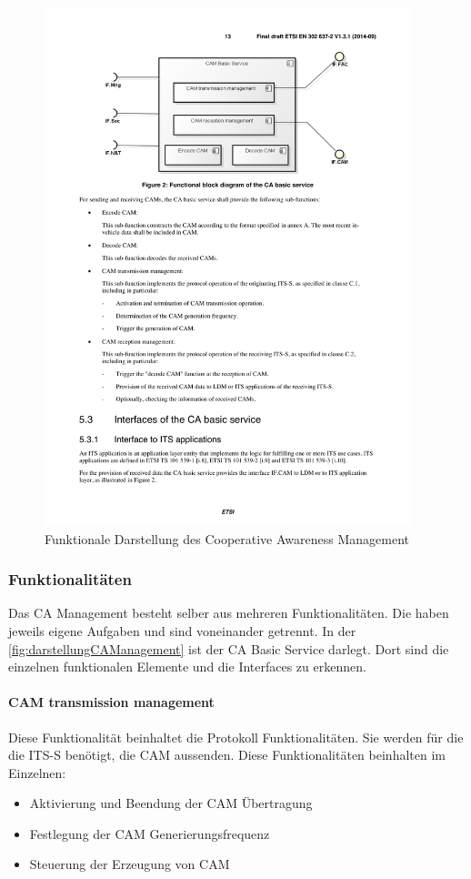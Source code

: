 \begin{figure}[htbp]
	\includegraphics[width=0.95\textwidth]{content/images/04_facilitylayer/caManagementLAyerUebersicht.pdf}
	\caption{Funktionale Darstellung des Cooperative Awareness Management}
	\label{fig:darstellungCAManagement}
\end{figure}

\subsubsection{Funktionalitäten}
Das \ac{CA} Management besteht selber aus mehreren Funktionalitäten. Die haben jeweils eigene Aufgaben und sind voneinander getrennt. In der \autoref{fig:darstellungCAManagement} ist der \ac{CA} Basic Service darlegt. Dort sind die einzelnen funktionalen Elemente und die Interfaces zu erkennen.

\paragraph{CAM transmission management}
Diese Funktionalität beinhaltet die Protokoll Funktionalitäten. Sie werden für die die \ac{ITS-S} benötigt, die \ac{CAM} aussenden. Diese Funktionalitäten beinhalten im Einzelnen:
\begin{itemize}
	\item Aktivierung und Beendung der \ac{CAM} Übertragung
	\item Festlegung der \ac{CAM} Generierungsfrequenz 
	\item Steuerung der Erzeugung von \ac{CAM}
\end{itemize}

